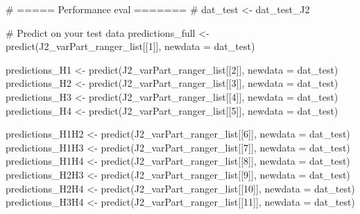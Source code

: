 \documentclass[
  letterpaper,
  DIV=11,
  numbers=noendperiod]{scrreprt}
\newenvironment{Shaded}{\begin{snugshade}}{\end{snugshade}}
\newcommand{\AttributeTok}[1]{\textcolor[rgb]{0.40,0.45,0.13}{#1}}
\newcommand{\CommentTok}[1]{\textcolor[rgb]{0.37,0.37,0.37}{#1}}
\newcommand{\DecValTok}[1]{\textcolor[rgb]{0.68,0.00,0.00}{#1}}
\newcommand{\FunctionTok}[1]{\textcolor[rgb]{0.28,0.35,0.67}{#1}}
\newcommand{\NormalTok}[1]{\textcolor[rgb]{0.00,0.23,0.31}{#1}}
\newcommand{\OtherTok}[1]{\textcolor[rgb]{0.00,0.23,0.31}{#1}}
\begin{document}
\begin{Shaded}
\begin{Highlighting}[]
\CommentTok{\# ===== Performance eval ======= \#}
\NormalTok{dat\_test }\OtherTok{\textless{}{-}}\NormalTok{ dat\_test\_J2}

\CommentTok{\# Predict on your test data}
\NormalTok{predictions\_full }\OtherTok{\textless{}{-}} \FunctionTok{predict}\NormalTok{(J2\_varPart\_ranger\_list[[}\DecValTok{1}\NormalTok{]], }\AttributeTok{newdata =}\NormalTok{ dat\_test)}

\NormalTok{predictions\_H1 }\OtherTok{\textless{}{-}} \FunctionTok{predict}\NormalTok{(J2\_varPart\_ranger\_list[[}\DecValTok{2}\NormalTok{]], }\AttributeTok{newdata =}\NormalTok{ dat\_test)}
\NormalTok{predictions\_H2 }\OtherTok{\textless{}{-}} \FunctionTok{predict}\NormalTok{(J2\_varPart\_ranger\_list[[}\DecValTok{3}\NormalTok{]], }\AttributeTok{newdata =}\NormalTok{ dat\_test)}
\NormalTok{predictions\_H3 }\OtherTok{\textless{}{-}} \FunctionTok{predict}\NormalTok{(J2\_varPart\_ranger\_list[[}\DecValTok{4}\NormalTok{]], }\AttributeTok{newdata =}\NormalTok{ dat\_test)}
\NormalTok{predictions\_H4 }\OtherTok{\textless{}{-}} \FunctionTok{predict}\NormalTok{(J2\_varPart\_ranger\_list[[}\DecValTok{5}\NormalTok{]], }\AttributeTok{newdata =}\NormalTok{ dat\_test)}

\NormalTok{predictions\_H1H2 }\OtherTok{\textless{}{-}} \FunctionTok{predict}\NormalTok{(J2\_varPart\_ranger\_list[[}\DecValTok{6}\NormalTok{]], }\AttributeTok{newdata =}\NormalTok{ dat\_test)}
\NormalTok{predictions\_H1H3 }\OtherTok{\textless{}{-}} \FunctionTok{predict}\NormalTok{(J2\_varPart\_ranger\_list[[}\DecValTok{7}\NormalTok{]], }\AttributeTok{newdata =}\NormalTok{ dat\_test)}
\NormalTok{predictions\_H1H4 }\OtherTok{\textless{}{-}} \FunctionTok{predict}\NormalTok{(J2\_varPart\_ranger\_list[[}\DecValTok{8}\NormalTok{]], }\AttributeTok{newdata =}\NormalTok{ dat\_test)}
\NormalTok{predictions\_H2H3 }\OtherTok{\textless{}{-}} \FunctionTok{predict}\NormalTok{(J2\_varPart\_ranger\_list[[}\DecValTok{9}\NormalTok{]], }\AttributeTok{newdata =}\NormalTok{ dat\_test)}
\NormalTok{predictions\_H2H4 }\OtherTok{\textless{}{-}} \FunctionTok{predict}\NormalTok{(J2\_varPart\_ranger\_list[[}\DecValTok{10}\NormalTok{]], }\AttributeTok{newdata =}\NormalTok{ dat\_test)}
\NormalTok{predictions\_H3H4 }\OtherTok{\textless{}{-}} \FunctionTok{predict}\NormalTok{(J2\_varPart\_ranger\_list[[}\DecValTok{11}\NormalTok{]], }\AttributeTok{newdata =}\NormalTok{ dat\_test)}


\end{Highlighting}
\end{Shaded}
\end{document}
